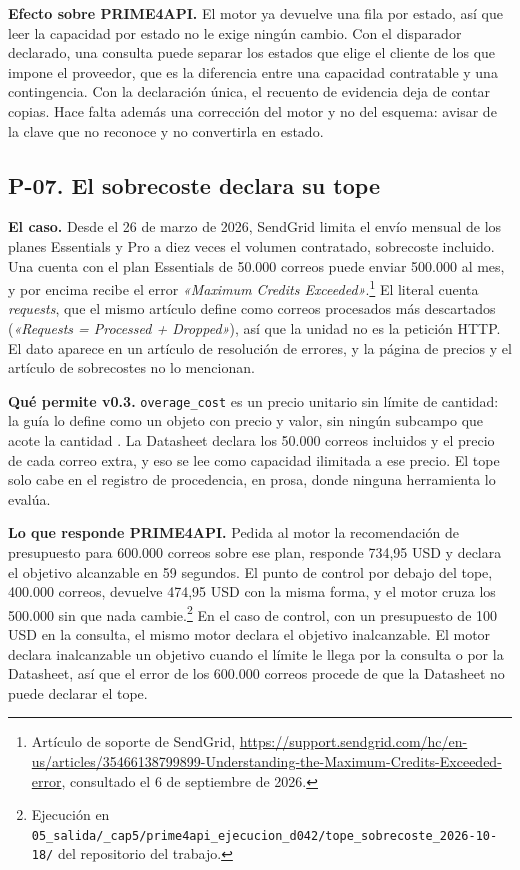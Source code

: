 \textbf{Efecto sobre PRIME4API.} El motor ya devuelve una fila por estado, así que leer la capacidad por estado no le exige ningún cambio.
Con el disparador declarado, una consulta puede separar los estados que elige el cliente de los que impone el proveedor, que es la diferencia entre una capacidad contratable y una contingencia.
Con la declaración única, el recuento de evidencia deja de contar copias.
Hace falta además una corrección del motor y no del esquema: avisar de la clave que no reconoce y no convertirla en estado.

\subsection{P-07. El sobrecoste declara su tope}
\label{subsec:evolucion:p07}

\textbf{El caso.} Desde el 26 de marzo de 2026, SendGrid limita el envío mensual de los planes Essentials y Pro a diez veces el volumen contratado, sobrecoste incluido.
Una cuenta con el plan Essentials de 50.000 correos puede enviar 500.000 al mes, y por encima recibe el error \textit{«Maximum Credits Exceeded»}.\footnote{Artículo de soporte de SendGrid, \url{https://support.sendgrid.com/hc/en-us/articles/35466138799899-Understanding-the-Maximum-Credits-Exceeded-error}, consultado el 6 de septiembre de 2026.}
El literal cuenta \textit{requests}, que el mismo artículo define como correos procesados más descartados (\textit{«Requests = Processed + Dropped»}), así que la unidad no es la petición HTTP.
El dato aparece en un artículo de resolución de errores, y la página de precios y el artículo de sobrecostes no lo mencionan.

\textbf{Qué permite v0.3.} \texttt{overage\_cost} es un precio unitario sin límite de cantidad: la guía lo define como un objeto con precio y valor, sin ningún subcampo que acote la cantidad \citep{apisconsumptionmodel}.
La Datasheet declara los 50.000 correos incluidos y el precio de cada correo extra, y eso se lee como capacidad ilimitada a ese precio.
El tope solo cabe en el registro de procedencia, en prosa, donde ninguna herramienta lo evalúa.

\textbf{Lo que responde PRIME4API.} Pedida al motor la recomendación de presupuesto para 600.000 correos sobre ese plan, responde 734,95 USD y declara el objetivo alcanzable en 59 segundos.
El punto de control por debajo del tope, 400.000 correos, devuelve 474,95 USD con la misma forma, y el motor cruza los 500.000 sin que nada cambie.\footnote{Ejecución en \texttt{05\_salida/\_cap5/prime4api\_ejecucion\_d042/tope\_sobrecoste\_2026-10-18/} del repositorio del trabajo.}
En el caso de control, con un presupuesto de 100 USD en la consulta, el mismo motor declara el objetivo inalcanzable.
El motor declara inalcanzable un objetivo cuando el límite le llega por la consulta o por la Datasheet, así que el error de los 600.000 correos procede de que la Datasheet no puede declarar el tope.

